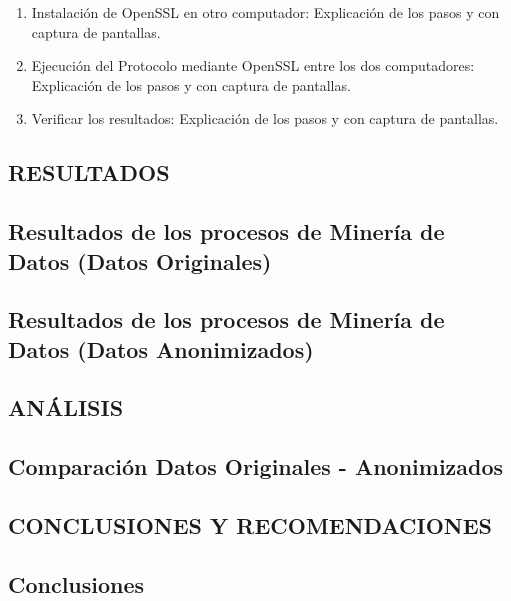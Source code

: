 \documentclass[a4paper,openright,12pt]{book}
\theoremstyle{definition}
\theoremstyle{remark}
\begin{document}
\begin{enumerate}
    
    \item Instalación de OpenSSL en otro computador: Explicación de los pasos y con captura de pantallas.
    \item Ejecución del Protocolo mediante OpenSSL entre los dos computadores: Explicación de los pasos y con captura de pantallas.
    \item Verificar los resultados: Explicación de los pasos y con captura de pantallas.
\end{enumerate}

\clearpage

\begin{center}
 \chapter{RESULTADOS}\label{cap.resultados}
\end{center}
\section{Resultados de los procesos de Minería de Datos (Datos Originales)}
\section{Resultados de los procesos de Minería de Datos (Datos Anonimizados)}
\clearpage

\begin{center}
 \chapter{ANÁLISIS}\label{cap.analisis}
\end{center}
\section{Comparación Datos Originales - Anonimizados}
\clearpage

\begin{center}
 \chapter{CONCLUSIONES Y RECOMENDACIONES}\label{cap.conclusiones}
\end{center}

\section{Conclusiones}
\end{document}
